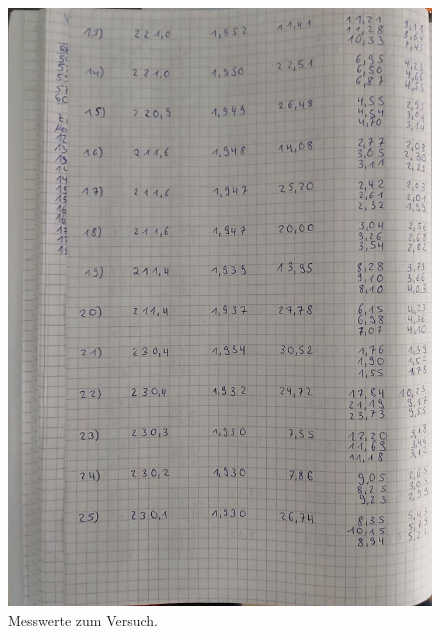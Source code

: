 \begin{figure}[H]
    \centering
     \includegraphics[scale=0.45]{Abbildungen/KladdeS2.jpeg}
    \caption{Messwerte zum Versuch.}
 \end{figure}
\pagebreak